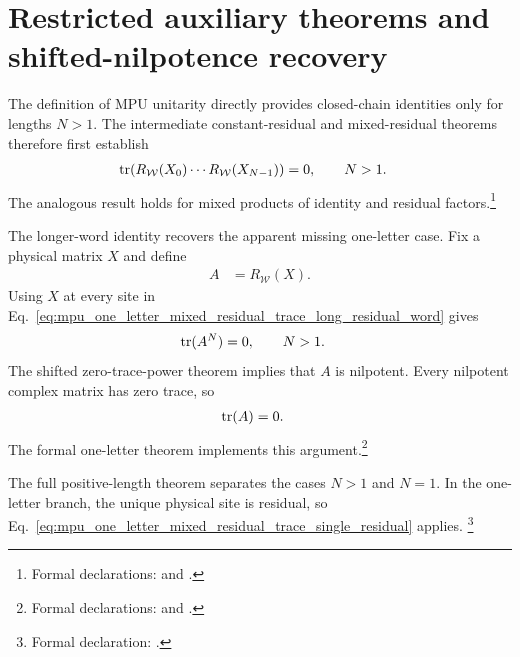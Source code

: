 \documentclass{article}
\begin{document}
\section{Restricted auxiliary theorems and shifted-nilpotence recovery}

The definition of MPU unitarity directly provides closed-chain identities only
for lengths $N>1$. The intermediate constant-residual and mixed-residual
theorems therefore first establish
\begin{align}
    \operatorname{tr}\!\left(R_{\mathcal W}(X_0)\cdots R_{\mathcal W}(X_{N-1})\right)
        &=0,
    \qquad N>1.
    \label{eq:mpu_one_letter_mixed_residual_trace_long_residual_word}
\end{align}
The analogous result holds for mixed products of identity and residual
factors.\footnote{Formal declarations:
  and
  .}

The longer-word identity recovers the apparent missing one-letter case. Fix a
physical matrix $X$ and define
\begin{align}
    A &= R_{\mathcal W}(X).
    \label{eq:mpu_one_letter_mixed_residual_trace_fixed_residual_matrix}
\end{align}
Using $X$ at every site in
Eq.~\ref{eq:mpu_one_letter_mixed_residual_trace_long_residual_word} gives
\begin{align}
    \operatorname{tr}(A^N) &= 0,
    \qquad N>1.
    \label{eq:mpu_one_letter_mixed_residual_trace_shifted_power_traces}
\end{align}
The shifted zero-trace-power theorem implies that $A$ is nilpotent. Every
nilpotent complex matrix has zero trace, so
\begin{align}
    \operatorname{tr}(A) &= 0.
    \label{eq:mpu_one_letter_mixed_residual_trace_single_residual}
\end{align}
The formal one-letter theorem implements this argument.\footnote{Formal
declarations:
   and
  .}

The full positive-length theorem separates the cases $N>1$ and $N=1$. In the
one-letter branch, the unique physical site is residual, so
Eq.~\ref{eq:mpu_one_letter_mixed_residual_trace_single_residual} applies.
\footnote{Formal declaration:
  .}
\end{document}
